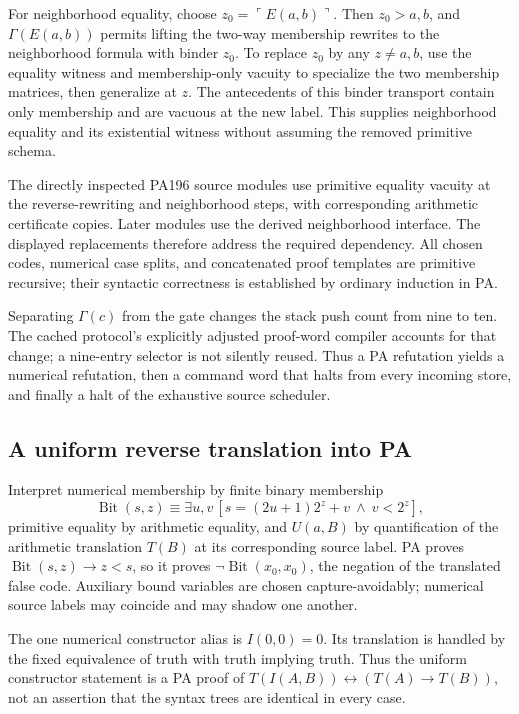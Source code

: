 For neighborhood equality, choose
$z_0=\ulcorner E(a,b)\urcorner$. Then $z_0>a,b$, and
$\Gamma(E(a,b))$ permits lifting the two-way membership rewrites to
the neighborhood formula with binder $z_0$. To replace $z_0$ by any
$z\ne a,b$, use the equality witness and membership-only vacuity to
specialize the two membership matrices, then generalize at $z$.
The antecedents of this binder transport contain only membership and
are vacuous at the new label. This supplies neighborhood equality and
its existential witness without assuming the removed primitive schema.

The directly inspected PA196 source modules use primitive equality
vacuity at the reverse-rewriting and neighborhood steps, with corresponding
arithmetic certificate copies. Later modules use the derived neighborhood
interface. The displayed replacements therefore address the required
dependency. All chosen codes, numerical case splits, and concatenated
proof templates are primitive recursive; their syntactic correctness
is established by ordinary induction in PA.

Separating $\Gamma(c)$ from the gate changes the stack push count from
nine to ten. The cached protocol's explicitly adjusted proof-word
compiler accounts for that change; a nine-entry selector is not silently
reused. Thus a PA refutation yields a numerical refutation, then a
command word that halts from every incoming store, and finally a halt
of the exhaustive source scheduler.

\subsection{A uniform reverse translation into PA}

Interpret numerical membership by finite binary membership
\[
 \operatorname{Bit}(s,z)\equiv
 \exists u,v\,[s=(2u+1)2^z+v\ \wedge\ v<2^z],
\]
primitive equality by arithmetic equality, and $U(a,B)$ by
quantification of the arithmetic translation $T(B)$ at its corresponding
source label. PA proves
$\operatorname{Bit}(s,z)\to z<s$, so it proves
$\neg\operatorname{Bit}(x_0,x_0)$, the negation of the translated false
code. Auxiliary bound variables are chosen capture-avoidably; numerical
source labels may coincide and may shadow one another.

The one numerical constructor alias is $I(0,0)=0$. Its translation is
handled by the fixed equivalence of truth with truth implying truth.
Thus the uniform constructor statement is a PA proof of
$T(I(A,B))\leftrightarrow(T(A)\to T(B))$, not an assertion that the
syntax trees are identical in every case.

